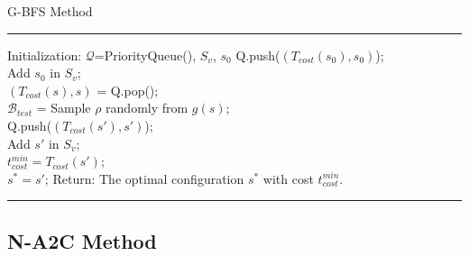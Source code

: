 \begin{algorithm}[htb]
\caption{G-BFS Method}
\label{alg:gbfs}
\vspace{.1cm}
\hrule
    \begin{algorithmic}[1]
    \vspace{.2cm}
    \STATE Initialization: $\mathcal{Q}$=PriorityQueue(), $S_v$, $s_0$
    \STATE Q.push($(T_{cost}(s_0), s_0)$);\\
    \STATE Add $s_0$ in $S_v$;\\
        \STATE $(T_{cost}(s), s)$ = Q.pop(); \\
        \STATE $\mathcal{B}_{test}$ = Sample $\rho$ randomly from $g(s)$; \\
                \STATE Q.push($(T_{cost}(s'), s')$); \\
                \STATE Add $s'$ in $S_v$;\\
                    \STATE $t_{cost}^{min} = T_{cost}(s')$; \\
                    \STATE $s^* = s'$;
                \ENDIF
            \ENDIF
        \ENDFOR
    \ENDWHILE
    \STATE Return: The optimal configuration $s^*$ with cost $t_{cost}^{min}$.
    \end{algorithmic}
\hrule
\end{algorithm}






\subsection{N-A2C Method}







